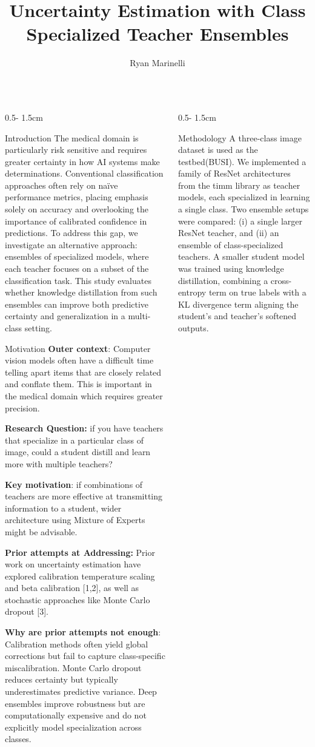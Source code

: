 \documentclass{uioposter}
\title{Uncertainty Estimation with Class Specialized Teacher Ensembles}
\author
{%
    Ryan Marinelli\inst{1}
}
\institute
{
    \inst{1} Department of Mathematics, University of Oslo
}
\begin{document}
\begin{frame}
\begin{columns}[onlytextwidth]


\begin{column}{0.5\textwidth - 1.5cm}
    \begin{block}{Introduction}
    The medical domain is particularly risk sensitive and requires greater certainty in how AI systems make determinations. Conventional classification approaches often rely on naïve performance metrics, placing emphasis solely on accuracy and overlooking the importance of calibrated confidence in predictions. To address this gap, we investigate an alternative approach: ensembles of specialized models, where each teacher focuses on a subset of the classification task. This study evaluates whether knowledge distillation from such ensembles can improve both predictive certainty and generalization in a multi-class setting.
    \end{block}

    \begin{block}{Motivation}
\textbf{Outer context}: Computer vision models often have a difficult time telling apart items that are closely related and conflate them. This is important in the medical domain which requires greater precision.

\textbf{Research Question:} if you have teachers that specialize in a particular class of image, could a student distill and learn more with multiple teachers?

\textbf{Key motivation}: if combinations of teachers are more effective at transmitting information to a student, wider architecture using Mixture of Experts might be advisable.

\textbf{Prior attempts at Addressing:} Prior work on uncertainty estimation have explored calibration temperature scaling and beta calibration [1,2], as well as stochastic approaches like Monte Carlo dropout [3]. 

\textbf{Why are prior attempts not enough}: Calibration methods often yield global corrections but fail to capture class-specific miscalibration. Monte Carlo dropout reduces certainty but typically underestimates predictive variance. Deep ensembles improve robustness but are computationally expensive and do not explicitly model specialization across classes. 


    \end{block}
\end{column}


\begin{column}{0.5\textwidth - 1.5cm}
    \begin{block}{Methodology}
        A three-class image dataset is used as the testbed(BUSI). We implemented a family of ResNet architectures from the timm library as teacher models, each specialized in learning a single class. Two ensemble setups were compared: (i) a single larger ResNet teacher, and (ii) an ensemble of class-specialized teachers. A smaller student model was trained using knowledge distillation, combining a cross-entropy term on true labels with a KL divergence term aligning the student’s and teacher’s softened outputs. 
    \end{block}


\end{column}
\end{columns}
\end{frame}
\end{document}

